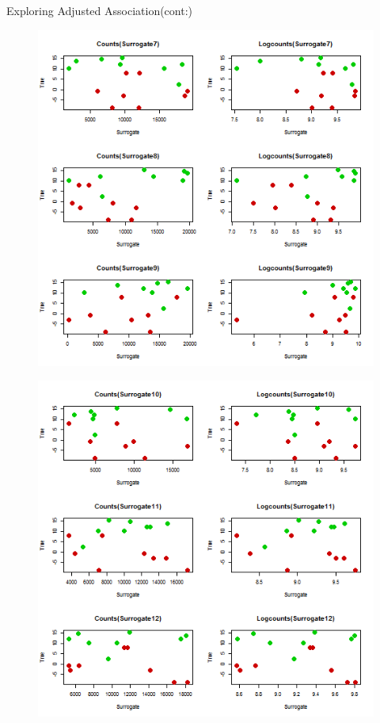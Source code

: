 \documentclass[a4paper,9pt]{beamer}\usepackage[]{graphicx}\usepackage[]{color}
\begin{document}
\begin{frame}{Exploring Adjusted Association(cont:)}
\begin{minipage}{0.3\textwidth}
\begin{figure}[H]
\includegraphics[scale=0.3]{first_presentation-figure/exploration-3.png}
\end{figure}
\end{minipage}
\hfill
\begin{minipage}{0.40\textwidth}
\begin{figure}[H]
\includegraphics[scale=0.3]{first_presentation-figure/exploration-4.png}
\end{figure}

\end{minipage}

\end{frame}
\end{document}
